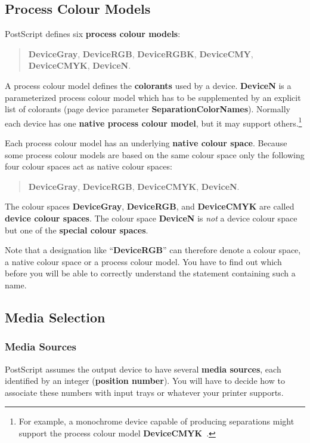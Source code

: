 \documentclass[twoside,a4paper]{article}
\newcommand{\ps}[1]{{\sffamily\bfseries #1}}	%
\renewcommand{\d}[1]{{\bfseries #1}}	%
\begin{document}
\subsection{Process Colour Models}

PostScript defines six \d{process colour models}:
\begin{quote}
  \ps{DeviceGray},
  \ps{DeviceRGB}, \ps{DeviceRGBK},
  \ps{DeviceCMY}, \ps{DeviceCMYK},
  \ps{DeviceN}.
\end{quote}
A process colour model defines the \d{colorants} used by a device.
\ps{DeviceN} is a parameterized process colour model which has to be
supplemented by an explicit list of colorants (page device parameter
\ps{SeparationColorNames}).
Normally each device has one \d{native process colour model},
but it may support others.\footnote{
  For example, a monochrome device capable of producing separations might
  support the process colour model
  \ps{DeviceCMYK}~\cite[page~424]{PostScript3}.}

Each process colour model has an underlying \d{native colour space}.
Because some process colour models are based on the same colour space
only the following four colour spaces act as native colour spaces:
\begin{quote}
  \ps{DeviceGray},
  \ps{DeviceRGB},
  \ps{DeviceCMYK},
  \ps{DeviceN}.
\end{quote}
The colour spaces \ps{DeviceGray}, \ps{DeviceRGB}, and \ps{DeviceCMYK} are
called \d{device colour spaces}.
The colour space \ps{DeviceN} is \emph{not\/} a device colour space
but one of the \d{special colour spaces}.

Note that a designation like ``\ps{DeviceRGB}'' can therefore denote a
colour space, a native colour space or a process colour model.
You have to find out which before you will be able to correctly understand
the statement containing such a name.


\subsection{Media Selection}

\subsubsection{Media Sources}

PostScript assumes the output device to have several \d{media sources},
each identified by an integer (\d{position number}).
You will have to decide how to associate these numbers with input trays or
whatever your printer supports.
\end{document}
